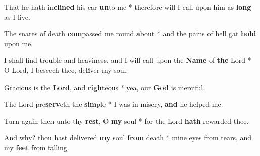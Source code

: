 \begin{multicols}{2}
	That he hath in\textbf{clined} his ear \textbf{un}to me * therefore will I call upon him as \textbf{long} as I live.
	
	The snares of death \textbf{com}passed me round \textbf{a}bout * and the pains of hell gat \textbf{hold} upon me.
	
	I shall find trouble and heaviness, and I will call upon the \textbf{Name} of \textbf{the} Lord * O Lord, I beseech thee, de\textbf{li}ver my soul.
	
	Gracious is the \textbf{Lord}, and \textbf{righ}teous * yea, our \textbf{God} is merciful.
	
	The Lord pre\textbf{serv}eth the \textbf{sim}ple * I was in misery, \textbf{and} he helped me.
	
	Turn again then unto thy \textbf{rest}, O \textbf{my} soul * for the Lord \textbf{hath} rewarded thee.
	
	And why? thou hast delivered \textbf{my} soul \textbf{from} death * mine eyes from tears, and my \textbf{feet} from falling.
	
\end{multicols}